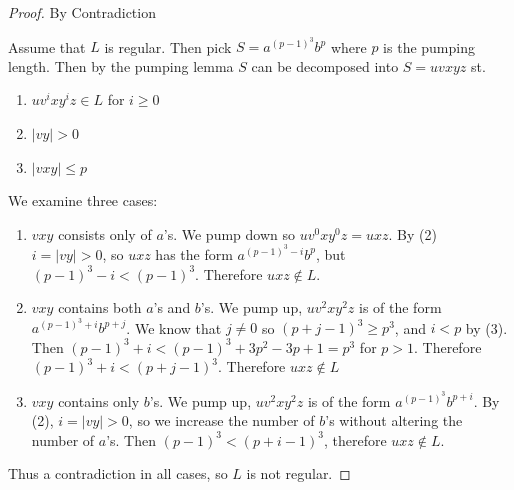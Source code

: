 \documentclass[11pt]{article}
\begin{document}
\begin{proof} By Contradiction

Assume that $L$ is regular. Then pick $S = a^{(p-1)^3} b^p$ where $p$ is the pumping length. Then by the pumping lemma $S$ can be decomposed into $S = uvxyz$ st.

\begin{enumerate}[(1)]

 \item $uv^ixy^iz \in L$ for $i \geq 0$
 \item $|vy| > 0$
 \item $|vxy| \leq p$
\end{enumerate}

We examine three cases:

\begin{enumerate}
  \item $vxy$ consists only of $a$'s. We pump down so $uv^0 x y^0 z = uxz$. By (2) $i = |vy| > 0$, so $uxz$ has the form $a^{(p-1)^3 - i} b^p$, but $(p-1)^3 - i < (p-1)^3$. Therefore $uxz \notin L$.
  \item $vxy$ contains both $a$'s and $b$'s. We pump up, $uv^2xy^2z$ is of the form $a^{(p-1)^3 + i} b^{p + j}$. We know that $j \neq 0$ so $(p + j - 1)^3 \geq p^3$, and $i < p$ by (3). Then $(p-1)^3 + i < (p-1)^3 + 3p^2 - 3p + 1 = p^3$ for $p > 1$. Therefore $(p-1)^3 + i < (p + j - 1)^3$. Therefore $uxz \notin L$
  \item $vxy$ contains only $b$'s. We pump up, $uv^2xy^2z$ is of the form $a^{(p-1)^3}b^{p + i}$. By (2), $i = |vy| > 0$, so we increase the number of $b$'s without altering the number of $a$'s. Then $(p-1)^3 < (p + i - 1)^3$, therefore $uxz \notin L$.
\end{enumerate}

Thus a contradiction in all cases, so $L$ is not regular.

\end{proof}
\end{document}
